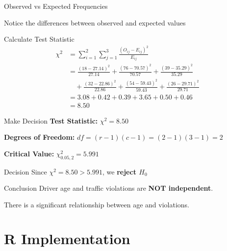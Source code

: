 \documentclass{beamer}					%
\begin{document}
\begin{frame}{Observed vs Expected Frequencies}
    
    
    \vspace{0.5em}
    Notice the differences between observed and expected values
\end{frame}

\begin{frame}{Calculate Test Statistic}
    \small
    \begin{align*}
    \chi^2 &= \sum\limits_{i=1}^2 \sum\limits_{j=1}^3 \frac{(O_{ij} - E_{ij})^2}{E_{ij}} \\[0.5em]
    &= \frac{(18 - 27.14)^2}{27.14} + \frac{(76 - 70.57)^2}{70.57} + \frac{(39 - 35.29)^2}{35.29} \\[0.3em]
    &\quad + \frac{(32 - 22.86)^2}{22.86} + \frac{(54 - 59.43)^2}{59.43} + \frac{(26 - 29.71)^2}{29.71} \\[0.5em]
    &= 3.08 + 0.42 + 0.39 + 3.65 + 0.50 + 0.46 \\[0.3em]
    &= 8.50
    \end{align*}
\end{frame}

\begin{frame}{Make Decision}
    \textbf{Test Statistic:} $\chi^2 = 8.50$
    
    \textbf{Degrees of Freedom:} $df = (r-1)(c-1)=(2-1)(3-1)=2$
    
    \textbf{Critical Value:} $\chi^2_{0.05, 2} = 5.991$
    
    \vspace{1em}
    
    \begin{block}{Decision}
    Since $\chi^2 = 8.50 > 5.991$, we \textbf{reject $H_0$}
    \end{block}
    
    \vspace{0.5em}
    
    \begin{alertblock}{Conclusion}
    Driver age and traffic violations are \textbf{NOT independent}.
    
    There is a significant relationship between age and violations.
    \end{alertblock}
\end{frame}



\section{R Implementation}
\end{document}
